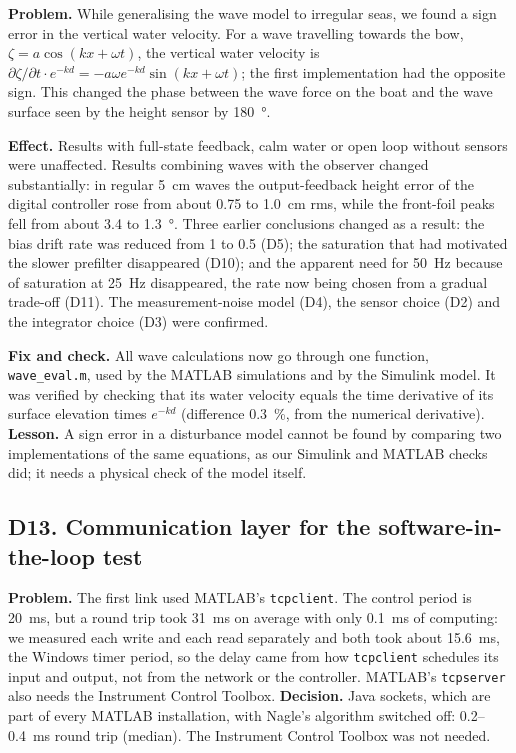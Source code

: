 \documentclass[11pt,a4paper]{article}
\begin{document}
\textbf{Problem.} While generalising the wave model to irregular seas, we found
a sign error in the vertical water velocity. For a wave travelling towards the
bow, $\zeta=a\cos(kx+\omega t)$, the vertical water velocity is
$\partial\zeta/\partial t\cdot e^{-kd}=-a\omega e^{-kd}\sin(kx+\omega t)$; the
first implementation had the opposite sign. This changed the phase between the
wave force on the boat and the wave surface seen by the height sensor by
\SI{180}{\degree}.

\textbf{Effect.} Results with full-state feedback, calm water or open loop
without sensors were unaffected. Results combining waves with the observer
changed substantially: in regular \SI{5}{cm} waves the output-feedback height
error of the digital controller rose from about 0.75 to \SI{1.0}{cm} rms, while
the front-foil peaks fell
from about 3.4 to \SI{1.3}{\degree}. Three earlier conclusions changed as a
result: the bias drift rate was reduced from 1 to 0.5 (D5); the saturation that
had motivated the slower prefilter disappeared (D10); and the apparent need for
\SI{50}{Hz} because of saturation at \SI{25}{Hz} disappeared, the rate now being
chosen from a gradual trade-off (D11). The measurement-noise model (D4), the
sensor choice (D2) and the integrator choice (D3) were confirmed.

\textbf{Fix and check.} All wave calculations now go through one function,
\texttt{wave\_eval.m}, used by the MATLAB simulations and by the Simulink model.
It was verified by checking that its water velocity equals the time derivative
of its surface elevation times $e^{-kd}$ (difference \SI{0.3}{\percent}, from the
numerical derivative). \textbf{Lesson.} A sign error in a disturbance model
cannot be found by comparing two implementations of the same equations, as our
Simulink and MATLAB checks did; it needs a physical check of the model itself.

\subsection{D13. Communication layer for the software-in-the-loop test}

\textbf{Problem.} The first link used MATLAB's \texttt{tcpclient}. The control
period is \SI{20}{ms}, but a round trip took \SI{31}{ms} on average with only
\SI{0.1}{ms} of computing: we measured each write and each read separately and
both took about \SI{15.6}{ms}, the Windows timer period, so the delay came from how
\texttt{tcpclient} schedules its input and output, not from the network or the
controller. MATLAB's \texttt{tcpserver} also needs the Instrument Control
Toolbox. \textbf{Decision.} Java sockets, which are part of every MATLAB
installation, with Nagle's algorithm switched off: 0.2--\SI{0.4}{ms} round trip
(median). The Instrument Control Toolbox was not needed.
\end{document}
